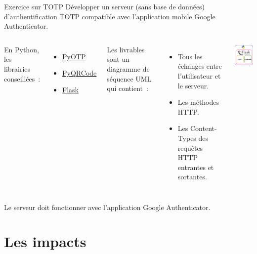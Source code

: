 \documentclass{beamer}
\begin{document}
    \begin{frame}{Exercice \execcounterdispinc sur TOTP}
        Développer un serveur (sans base de données) d'authentification TOTP compatible avec l'application mobile Google Authenticator.
        \bigbreak
        \begin{columns}
            En Python, les librairies conseillées~:
            \begin{itemize}
                \item \href{https://pyauth.github.io/pyotp/}{PyOTP}
                \item \href{https://pythonhosted.org/PyQRCode/}{PyQRCode}
                \item \href{https://flask.palletsprojects.com/en/3.0.x/}{Flask}
            \end{itemize}
            Les livrables sont un diagramme de séquence UML qui contient~:
            \begin{itemize}
                \item Tous les échanges entre l'utilisateur et le serveur.
                \item Les méthodes HTTP.
                \item Les Content-Types des requêtes HTTP entrantes et sortantes.
            \end{itemize}
            \begin{center}
                \includegraphics[width=4cm]{image/totp-server.drawio}
            \end{center}
        \end{columns}
        \bigbreak
        Le serveur doit fonctionner avec l'application Google Authenticator.
    \end{frame}


    \section{Les impacts}\label{sec:les-impacts}
\end{document}
